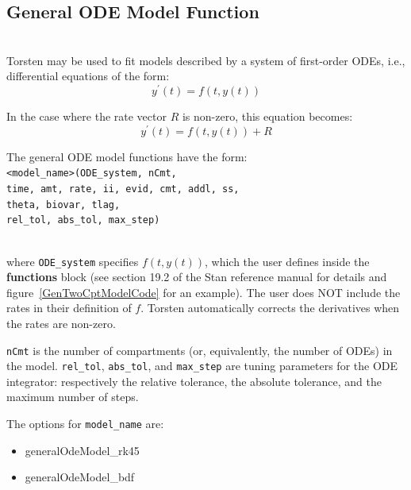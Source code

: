 \documentclass[11pt]{amsart}
\begin{document}
\subsection{General ODE Model Function} \ \\

Torsten may be used to fit models described by a system of first-order ODEs, i.e., differential equations of the form:
$$ y^\prime(t) = f(t, y(t)) $$

In the case where the rate vector $R$ is non-zero, this equation becomes:
$$ y^\prime(t) = f(t, y(t)) + R $$
  
The general ODE model functions have the form: \ \\

\texttt{<model\_name>(ODE\_system, nCmt, \\
\phantom{<model\_name>} time, amt, rate, ii, evid, cmt, addl, ss, \\
\phantom{<model\_name>} theta, biovar, tlag, \\                              
\phantom{<model\_name>} rel\_tol, abs\_tol, max\_step)}

\ \\
where \texttt{ODE\_system} specifies $f(t, y(t))$, which the user defines inside the \textbf{functions} block (see section 19.2 of the Stan reference manual for details and figure~\ref{GenTwoCptModelCode} for an example). The user does NOT include the rates in their definition of $f$. Torsten automatically corrects the derivatives when the rates are non-zero.

\texttt{nCmt} is the number of compartments (or, equivalently, the number of ODEs) in the model. \texttt{rel\_tol}, \texttt{abs\_tol}, and \texttt{max\_step} are tuning parameters for the ODE integrator: respectively the relative tolerance, the absolute tolerance, and the maximum number of steps.

The options for \texttt{model\_name} are:
\begin{itemize}
  \item generalOdeModel\_rk45
  \item generalOdeModel\_bdf
\end{itemize}
\end{document}
